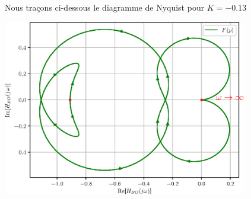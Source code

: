Nous traçons ci-dessous le diagramme de Nyquist pour $K=-0.13$
\begin{center}
\includegraphics[width=0.8\textwidth]{fig/exercice_nyquist_chap_stab_ex1_corrige.eps}
\end{center}


